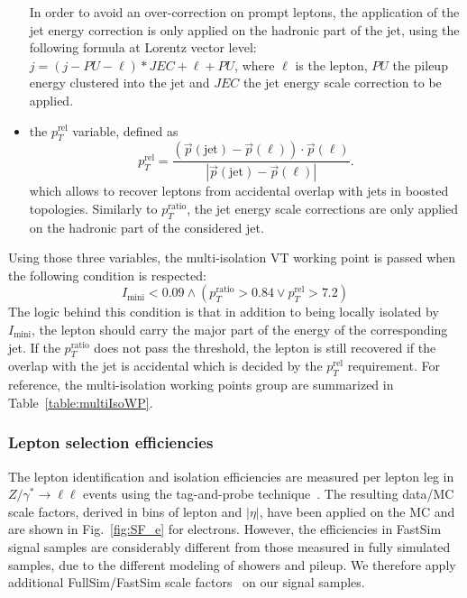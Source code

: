 \begin{itemize}
              In order to avoid an over-correction on prompt leptons, the application of the jet energy correction is only applied on the hadronic part of the jet, using the 
              following formula at Lorentz vector level: $j = (j - PU - \ell)*JEC + \ell + PU$, where $\ell$ is the lepton, 
              $PU$ the pileup energy clustered into the jet and $JEC$ the jet energy scale correction to be applied.
        \item the $p_T^\text{rel}$ variable, defined as
              \begin{equation}
                p_T^\text{rel} = \frac{\left(\vec{p}(\text{jet})-\vec{p}(\ell)\right) \cdot \vec{p}(\ell)}{|\vec{p}(\text{jet})-\vec{p}(\ell)|}.
              \end{equation}
              which allows to recover leptons from accidental overlap with jets in boosted topologies. Similarly to $p_T^\text{ratio}$, the jet energy scale corrections are only applied on the hadronic part of
              the considered jet.
      \end{itemize}
      Using those three variables, the multi-isolation VT working point is passed when the following condition is respected:
      \begin{equation}
        I_\text{mini} < 0.09 \wedge ( p_T^\text{ratio} > 0.84 \vee p_T^\text{rel} > 7.2 )
      \end{equation}
      The logic behind this condition is that in addition to being locally isolated by $I_\text{mini}$, the lepton should carry the major part of the energy of the corresponding jet. If the $p_T^\text{ratio}$ does
      not pass the threshold, the lepton is still recovered if the overlap with the jet is accidental which is decided by the $p_T^\text{rel}$ requirement.
      For reference, the multi-isolation working points group are summarized in Table~\ref{table:multiIsoWP}.
      
    \subsubsection{Lepton selection efficiencies}
      The lepton identification and isolation efficiencies are measured per lepton leg in $Z/\gamma^*\rightarrow \ell\ell$ events using the tag-and-probe technique~\cite{twiki:SF}.
      The resulting data/MC scale factors, derived in bins of lepton \pt and $|\eta|$, have been applied on the MC and are shown in Fig.~\ref{fig:SF_e} for electrons.
      However, the efficiencies in FastSim signal samples are considerably different from those measured in fully simulated samples, due to the different modeling of showers and pileup.
      We therefore apply additional FullSim/FastSim scale factors~\citep{twiki:FSSF} on our signal samples.

